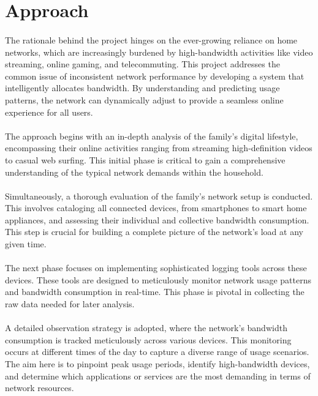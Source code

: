 \documentclass[10pt]{article}
\begin{document}
\section{Approach} %

\paragraph{}
The rationale behind the project hinges on the ever-growing reliance on home networks, which are increasingly burdened by high-bandwidth activities like video streaming, online gaming, and telecommuting. This project addresses the common issue of inconsistent network performance by developing a system that intelligently allocates bandwidth. By understanding and predicting usage patterns, the network can dynamically adjust to provide a seamless online experience for all users.

\paragraph{}
The approach begins with an in-depth analysis of the family’s digital lifestyle, encompassing their online activities ranging from streaming high-definition videos to casual web surfing. This initial phase is critical to gain a comprehensive understanding of the typical network demands within the household.

\paragraph{}
Simultaneously, a thorough evaluation of the family's network setup is conducted. This involves cataloging all connected devices, from smartphones to smart home appliances, and assessing their individual and collective bandwidth consumption. This step is crucial for building a complete picture of the network's load at any given time.

\paragraph{}
The next phase focuses on implementing sophisticated logging tools across these devices. These tools are designed to meticulously monitor network usage patterns and bandwidth consumption in real-time. This phase is pivotal in collecting the raw data needed for later analysis.

\paragraph{}
A detailed observation strategy is adopted, where the network's bandwidth consumption is tracked meticulously across various devices. This monitoring occurs at different times of the day to capture a diverse range of usage scenarios. The aim here is to pinpoint peak usage periods, identify high-bandwidth devices, and determine which applications or services are the most demanding in terms of network resources.
\end{document}
